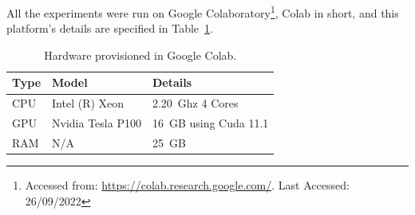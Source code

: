All the experiments were run on Google Colaboratory\footnote{Accessed from: \url{https://colab.research.google.com/}. Last Accessed: 26/09/2022}, Colab in short, and this platform's details are specified in Table~\ref{tab:hardware}.

\begin{table}
    \centering
    \begin{tabular}{@{}lll@{}}
        \hline
        \textbf{Type} & \textbf{Model} & \textbf{Details} \\
        \hline
        CPU & Intel (R) Xeon & 2.20~Ghz 4 Cores \\
        GPU & Nvidia Tesla P100 & 16~GB using Cuda 11.1 \\
        RAM & N/A & 25~GB \\
        \hline
    \end{tabular}
    \caption{Hardware provisioned in Google Colab.}
    \label{tab:hardware}
\end{table}
